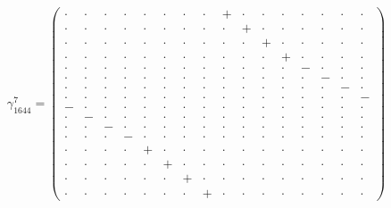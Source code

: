 \documentclass[
  10pt,
]{article}
\begin{document}
\[\gamma_{1644}^7=\left(\begin{smallmatrix} \cdot & \cdot & \cdot & \cdot & \cdot & \cdot & \cdot & \cdot & + & \cdot & \cdot & \cdot & \cdot & \cdot & \cdot & \cdot \\ \cdot & \cdot & \cdot & \cdot & \cdot & \cdot & \cdot & \cdot & \cdot & + & \cdot & \cdot & \cdot & \cdot & \cdot & \cdot \\ \cdot & \cdot & \cdot & \cdot & \cdot & \cdot & \cdot & \cdot & \cdot & \cdot & + & \cdot & \cdot & \cdot & \cdot & \cdot \\ \cdot & \cdot & \cdot & \cdot & \cdot & \cdot & \cdot & \cdot & \cdot & \cdot & \cdot & + & \cdot & \cdot & \cdot & \cdot \\ \cdot & \cdot & \cdot & \cdot & \cdot & \cdot & \cdot & \cdot & \cdot & \cdot & \cdot & \cdot & - & \cdot & \cdot & \cdot \\ \cdot & \cdot & \cdot & \cdot & \cdot & \cdot & \cdot & \cdot & \cdot & \cdot & \cdot & \cdot & \cdot & - & \cdot & \cdot \\ \cdot & \cdot & \cdot & \cdot & \cdot & \cdot & \cdot & \cdot & \cdot & \cdot & \cdot & \cdot & \cdot & \cdot & - & \cdot \\ \cdot & \cdot & \cdot & \cdot & \cdot & \cdot & \cdot & \cdot & \cdot & \cdot & \cdot & \cdot & \cdot & \cdot & \cdot & - \\ - & \cdot & \cdot & \cdot & \cdot & \cdot & \cdot & \cdot & \cdot & \cdot & \cdot & \cdot & \cdot & \cdot & \cdot & \cdot \\ \cdot & - & \cdot & \cdot & \cdot & \cdot & \cdot & \cdot & \cdot & \cdot & \cdot & \cdot & \cdot & \cdot & \cdot & \cdot \\ \cdot & \cdot & - & \cdot & \cdot & \cdot & \cdot & \cdot & \cdot & \cdot & \cdot & \cdot & \cdot & \cdot & \cdot & \cdot \\ \cdot & \cdot & \cdot & - & \cdot & \cdot & \cdot & \cdot & \cdot & \cdot & \cdot & \cdot & \cdot & \cdot & \cdot & \cdot \\ \cdot & \cdot & \cdot & \cdot & + & \cdot & \cdot & \cdot & \cdot & \cdot & \cdot & \cdot & \cdot & \cdot & \cdot & \cdot \\ \cdot & \cdot & \cdot & \cdot & \cdot & + & \cdot & \cdot & \cdot & \cdot & \cdot & \cdot & \cdot & \cdot & \cdot & \cdot \\ \cdot & \cdot & \cdot & \cdot & \cdot & \cdot & + & \cdot & \cdot & \cdot & \cdot & \cdot & \cdot & \cdot & \cdot & \cdot \\ \cdot & \cdot & \cdot & \cdot & \cdot & \cdot & \cdot & + & \cdot & \cdot & \cdot & \cdot & \cdot & \cdot & \cdot & \cdot \end{smallmatrix}\right)\]
\end{document}
